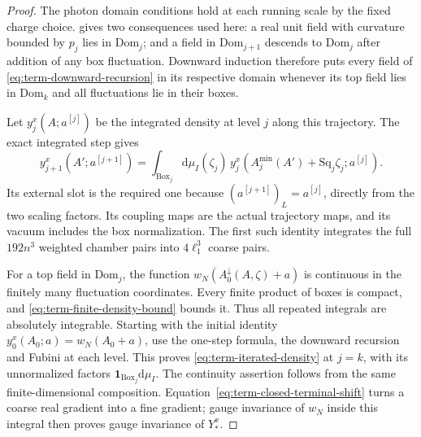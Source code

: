 \documentclass[11pt,letterpaper,reqno]{amsart}
\newcommand{\dd}{\mathrm d}
\begin{document}
\begin{proof}
The photon domain conditions
\cite[(43)]{MaxwellBlock} hold at each
running scale by the fixed charge choice.
\cite[Theorem~B]{MaxwellBlock} gives
two consequences used here: a real unit field with
curvature bounded by $p_j$ lies in $\mathrm{Dom}_j$;
and a field in $\mathrm{Dom}_{j+1}$ descends to
$\mathrm{Dom}_j$ after addition of any box fluctuation.
Downward induction therefore puts every field of
\eqref{eq:term-downward-recursion} in its respective
domain whenever its top field lies in $\mathrm{Dom}_k$ and
all fluctuations lie in their boxes.

Let $y_j^x(A;a^{[j]})$ be the integrated density
at level $j$ along this trajectory.
The exact integrated step \cite[(9)]{NonlinearStep} gives
\[
 y_{j+1}^x(A';a^{[j+1]})
     =\int_{\mathrm{Box}_j}\dd\mu_I(\zeta_j)\,
                   y_j^x(A_j^{\min}(A')+\mathrm{Sq}_j\zeta_j;
                                                               a^{[j]}).
\]
Its external slot is the required one because
$(a^{[j+1]})_L=a^{[j]}$, directly from the two
scaling factors.
Its coupling maps are the actual trajectory maps,
and its vacuum includes the box normalization.
The first such identity integrates the full
$192n^3$ weighted chamber pairs into
$4\ell_1^3$ coarse pairs.

For a top field in $\mathrm{Dom}_j$, the function
$w_N(A_0^\downarrow(A,\zeta)+a)$ is continuous in
the finitely many fluctuation coordinates.
Every finite product of boxes is compact,
and \eqref{eq:term-finite-density-bound} bounds it.
Thus all repeated integrals are absolutely integrable.
Starting with the initial identity
$y_0^x(A_0;a)=w_N(A_0+a)$, use the one-step formula,
the downward recursion and Fubini at each level.
This proves \eqref{eq:term-iterated-density} at $j=k$,
with its unnormalized factors
$\mathbf1_{\mathrm{Box}_j}\dd\mu_I$.
The continuity assertion follows from the same
finite-dimensional composition.
Equation~\eqref{eq:term-closed-terminal-shift}
turns a coarse real gradient into a fine gradient;
gauge invariance of $w_N$ inside this integral
then proves gauge invariance of $Y_*^x$.


\end{proof}
\end{document}

